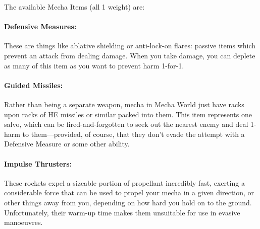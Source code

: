 The available Mecha Items (all 1 weight) are:

\paragraph{Defensive Measures:}
These are things like ablative shielding or anti-lock-on flares: passive items which prevent an attack from dealing damage. When you take damage, you can deplete as many of this item as you want to prevent harm 1-for-1.

\paragraph{Guided Missiles:}
Rather than being a separate weapon, mecha in Mecha World just have racks upon racks of HE missiles or similar packed into them. This item represents one salvo, which can be fired-and-forgotten to seek out the nearest enemy and deal 1-harm to them---provided, of course, that they don't evade the attempt with a Defensive Measure or some other ability.

\paragraph{Impulse Thrusters:}
These rockets expel a sizeable portion of propellant incredibly fast, exerting a considerable force that can be used to propel your mecha in a given direction, or other things away from you, depending on how hard you hold on to the ground. Unfortunately, their warm-up time makes them unsuitable for use in evasive manoeuvres.
